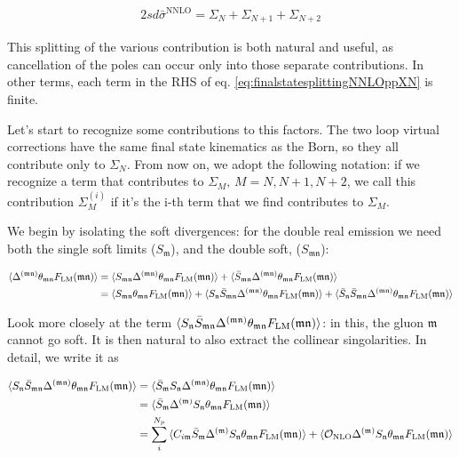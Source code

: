 \documentclass[11pt]{report}
\begin{document}
\begin{align}
    \label{eq:finalstatesplittingNNLOppXN}
    2sd\bar{\sigma}^{\text{NNLO}} = \Sigma_{N} + \Sigma_{N+1} +\Sigma_{N+2}
\end{align}

This splitting of the various contribution is both natural and useful, as cancellation of the poles can occur only into those separate contributions. In other terms, each term in the RHS of eq. \ref{eq:finalstatesplittingNNLOppXN} is finite.  

Let's start to recognize some contributions to this factors. The two loop virtual corrections have the same final state kinematics as the Born, so they all contribute only to \(\Sigma_N\). From now on, we adopt the following notation: if we recognize a term that contributes to \(\Sigma_{M}, \, M = N, N+1, N+2\), we call this contribution \(\Sigma_M^{(i)}\) if it's the i-th term that we find contributes to \(\Sigma_M\). 

We begin by isolating the soft divergences: for the double real emission we need both the single soft limits (\(S_{\mathfrak{m}}\)), and the double soft, (\(S_{\mathfrak{mn}}\)): 

\begin{align}
    \braket{\Delta^{(\mathfrak{mn})}\theta_{\mathfrak{mn}}F_{\text{LM}}({\mathfrak{mn}})} &= \braket{S_{\mathfrak{mn}}\Delta^{(\mathfrak{mn})}\theta_{\mathfrak{mn}}F_{\text{LM}}({\mathfrak{mn}})} + \braket{\bar{S}_{\mathfrak{mn}}\Delta^{(\mathfrak{mn})}\theta_{\mathfrak{mn}}F_{\text{LM}}({\mathfrak{mn}})} \notag \\ 
    &= \braket{S_{\mathfrak{mn}}\theta_{\mathfrak{mn}}F_{\text{LM}}({\mathfrak{mn}})} + \braket{S_{\mathfrak{n}}\bar{S}_{\mathfrak{mn}}\Delta^{(\mathfrak{mn})}\theta_{\mathfrak{mn}}F_{\text{LM}}({\mathfrak{mn}})} + \braket{\bar{S}_{\mathfrak{n}}\bar{S}_{\mathfrak{mn}}\Delta^{(\mathfrak{mn})}\theta_{\mathfrak{mn}}F_{\text{LM}}({\mathfrak{mn}})}
\end{align}

Look more closely at the term \(\braket{S_{\mathfrak{n}}\bar{S}_{\mathfrak{mn}}\Delta^{(\mathfrak{mn})}\theta_{\mathfrak{mn}}F_{\text{LM}}({\mathfrak{mn}})}\): in this, the gluon \(\mathfrak{m}\) cannot go soft. It is then natural to also extract the collinear singolarities. In detail, we write it as 

\begin{align}
    \braket{S_{\mathfrak{n}}\bar{S}_{\mathfrak{mn}}\Delta^{(\mathfrak{mn})}\theta_{\mathfrak{mn}}F_{\text{LM}}({\mathfrak{mn}})} &= \braket{\bar{S}_{\mathfrak{m}}S_{\mathfrak{n}}\Delta^{(\mathfrak{mn})}\theta_{\mathfrak{mn}}F_{\text{LM}}({\mathfrak{mn}})} \notag \\ 
    &= \braket{\bar{S}_{\mathfrak{m}}\Delta^{(\mathfrak{m})}S_{\mathfrak{n}}\theta_{\mathfrak{mn}}F_{\text{LM}}({\mathfrak{mn}})} \notag \\ 
    &= \sum_{i}^{N_p}\braket{C_{i\mathfrak{m}}\bar{S}_{\mathfrak{m}}\Delta^{(\mathfrak{m})}S_{\mathfrak{n}}\theta_{\mathfrak{mn}}F_{\text{LM}}({\mathfrak{mn}})} + \braket{\mathcal{O}_{\text{NLO}}\Delta^{(\mathfrak{m})}S_{\mathfrak{n}}\theta_{\mathfrak{mn}}F_{\text{LM}}({\mathfrak{mn}})}
\end{align}
\end{document}
